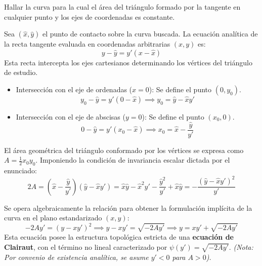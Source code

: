 \begin{ejercicio}
Hallar la curva para la cual el área del triángulo formado por la tangente en cualquier punto y los ejes de coordenadas es constante.
\end{ejercicio}

\begin{tcolorbox}
Sea $(\hat{x}, \hat{y})$ el punto de contacto sobre la curva buscada. La ecuación analítica de la recta tangente evaluada en coordenadas arbitrarias $(x,y)$ es:
$$ y - \hat{y} = y'(x - \hat{x}) $$
Esta recta intercepta los ejes cartesianos determinando los vértices del triángulo de estudio.
\begin{itemize}
    \item Intersección con el eje de ordenadas ($x=0$): Se define el punto $(0, y_0)$.
    $$ y_0 - \hat{y} = y'(0 - \hat{x}) \implies y_0 = \hat{y} - \hat{x}y' $$
    \item Intersección con el eje de abscisas ($y=0$): Se define el punto $(x_0, 0)$.
    $$ 0 - \hat{y} = y'(x_0 - \hat{x}) \implies x_0 = \hat{x} - \frac{\hat{y}}{y'} $$
\end{itemize}

El área geométrica del triángulo conformado por los vértices se expresa como $A = \frac{1}{2}x_0 y_0$. Imponiendo la condición de invariancia escalar dictada por el enunciado:
$$ 2A = \left( \hat{x} - \frac{\hat{y}}{y'} \right)(\hat{y} - \hat{x}y') = \hat{x}\hat{y} - \hat{x}^2 y' - \frac{\hat{y}^2}{y'} + \hat{x}\hat{y} = -\frac{(\hat{y} - \hat{x}y')^2}{y'} $$

Se opera algebraicamente la relación para obtener la formulación implícita de la curva en el plano estandarizado $(x,y)$:
$$ -2A y' = (y - x y')^2 \implies y - x y' = \sqrt{-2A y'} \implies y = x y' + \sqrt{-2A y'} $$
Esta ecuación posee la estructura topológica estricta de una \textbf{ecuación de Clairaut}, con el término no lineal caracterizado por $\psi(y') = \sqrt{-2A y'}$. \textit{(Nota: Por convenio de existencia analítica, se asume $y' < 0$ para $A>0$).}


\end{tcolorbox}
